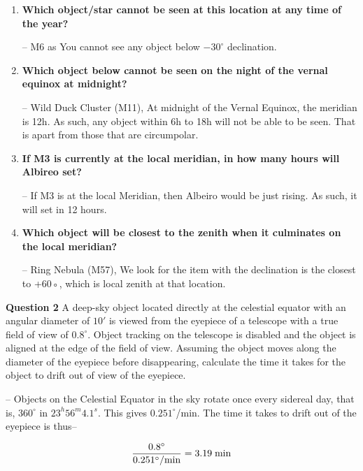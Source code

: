 \documentclass[a4paper,12pt]{extarticle}
\begin{document}
\begin{enumerate}[Q1.]
	\item \textbf{Which object/star cannot be seen at this location at any time of the year?}
	\begin{sol}
		-- M6 as You cannot see any object below $-30^\circ$ declination.
	\end{sol}
	\item \textbf{Which object below cannot be seen on the night of the vernal equinox at midnight?}
	\begin{sol}
		-- Wild Duck Cluster (M11), At midnight of the Vernal Equinox, the meridian is 12h. As such, any object within 6h to 18h will not be able to be seen. That is apart from those that are circumpolar.	
	\end{sol}
	\item \textbf{If M3 is currently at the local meridian, in how many hours will Albireo set?}
	
	\begin{sol}
		-- If M3 is at the local Meridian, then Albeiro would be just rising. As such, it will set in 12 hours.
	\end{sol}
	\item \textbf{Which object will be closest to the zenith when it culminates on the local meridian?}
	
	\begin{sol}
		-- Ring Nebula (M57), We look for the item with the declination is the closest to +60◦, which is local zenith at that location.
	\end{sol}
\end{enumerate}

   
\textsf{\textbf{Question 2}}  A deep-sky object located directly at the celestial equator with an angular diameter of $10'$ is viewed from the eyepiece of a telescope with a true field of view of $0.8^\circ$. Object tracking on the telescope is disabled and the object is aligned at the edge of the field of view. Assuming the object moves along the diameter of the eyepiece before disappearing, calculate the time it takes for the object to drift out of view of the eyepiece.

\begin{sol}
-- Objects on the Celestial Equator in the sky rotate once every sidereal day, that is, $360^\circ$ in $23^h56^m4.1^s$. This gives $0.251^\circ$/min. The time it takes to drift out of the eyepiece is thus--

\[\frac{0.8^\circ}{0.251^\circ/\rm min}=3.19\; \rm min\]	
\end{sol}
\end{document}
